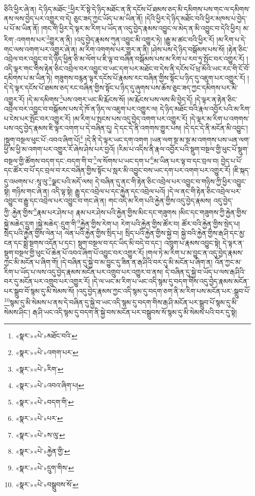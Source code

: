 ཅིའི་ཕྱིར་ཞེ་ན། དེ་ཉིད་མཐོང་\footnote{«སྣར་»«པེ་»མཐོང་བའི་}ཕྱིར་རོ་སྟེ་དེ་ཉིད་མཐོང་ན་ནི་དངོས་པོ་ཐམས་ཅད་མི་དམིགས་པས་གང་ལ་དམིགས་ནས་ལས་བྱེད་པར་འགྱུར་བ་དེ། ཅུང་ཟད་ཀྱང་ཡོད་པ་མ་ཡིན་ནོ། །དེའི་ཕྱིར་དེ་ཉིད་མཐོང་བའི་ཕྱིར་མཁས་པ་བྱེད་པ་པོ་མ་ཡིན་ནོ། །གང་གི་ཕྱིར་དེ་ལྟར་མ་རིག་པ་ཡོད་ན་འདུ་བྱེད་རྣམས་འབྱུང་ལ་མེད་ན་མི་འབྱུང་བ་དེའི་ཕྱིར། མ་རིག་:འགགས་པར་\footnote{«སྣར་»«པེ་»འགག་པར་}གྱུར་ན་ནི། །འདུ་བྱེད་རྣམས་ཀུན་འབྱུང་མི་འགྱུར་ཏེ། །རྒྱུ་མ་ཚང་བའི་ཕྱིར་རོ། །མ་རིག་པ་དེ་གང་ལས་འགག་པར་འགྱུར་ཞེ་ན། མ་རིག་འགགས་པར་གྱུར་ན་ནི། །ཤེས་པས་དེ་ཉིད་བསྒོམས་པས་སོ། །རྟེན་ཅིང་འབྲེལ་བར་འབྱུང་བ་དེ་ཉིད་ཕྱིན་ཅི་མ་ལོག་པ་ཇི་ལྟ་བ་བཞིན་བསྒོམས་པས་མ་རིག་པ་རབ་ཏུ་སྤོང་བར་འགྱུར་རོ། །འདི་ལྟར་གང་གིས་རྟེན་ཅིང་འབྲེལ་བར་འབྱུང་བ་ཡང་དག་པར་མཐོང་བ་དེས་ནི་དངོས་པོ་ཕྲ་མོའི་ཡང་རང་གི་ངོ་བོ་དམིགས་པ་མ་ཡིན་ཏེ། གཟུགས་བརྙན་ལྟར་དངོས་པོ་རྣམས་རང་བཞིན་གྱིས་སྟོང་པ་ཉིད་དུ་འཇུག་པར་འགྱུར་རོ། །དེ་དེ་ལྟར་དངོས་པོ་ཐམས་ཅད་རང་བཞིན་གྱིས་སྟོང་པ་ཉིད་དུ་ཞུགས་པས་ཆོས་ཅུང་ཟད་ཀྱང་དམིགས་པར་མི་འགྱུར་རོ། །དེ་མ་དམིགས་\footnote{«སྣར་»«པེ་»རིག་}པས་འགར་ཡང་མི་རྨོངས་སོ། །མ་རྨོངས་པས་ལས་མི་བྱེད་དོ། །དེ་ལྟར་ན་རྟེན་ཅིང་འབྲེལ་བར་འབྱུང་བ་བསྒོམས་པས་དེ་ཁོ་ན་ཉིད་ལ་འཇུག་པར་འགྱུར་ལ། དེ་ཉིད་མཐོང་བའི་རྣལ་འབྱོར་པའི་མ་རིག་པ་ངེས་པར་སྤོང་བར་འགྱུར་རོ། །མ་རིག་པ་སྤངས་པས་འདུ་བྱེད་འགག་པར་འགྱུར་རོ། །དེ་ལྟར་མ་རིག་པ་འགགས་པས་འདུ་བྱེད་རྣམས་ཇི་ལྟར་འགག་པ་དེ་བཞིན་དུ། དེ་དང་དེ་ནི་འགགས་གྱུར་པས། །དེ་དང་དེ་ནི་མངོན་མི་འབྱུང་། །སྡུག་བསྔལ་ཕུང་པོ་:འབའ་ཞིག་པོ།\footnote{«སྣར་»«པེ་»འབའ་ཞིག་པ།} །དེ་ནི་དེ་ལྟར་ཡང་དག་འགག །ཡན་ལག་སྔ་མ་སྔ་མ་འགགས་པས་ཡན་ལག་ཕྱི་མ་ཕྱི་མ་འགག་པར་འགྱུར་རོ་ཞེས་ཤེས་པར་བྱའོ། །རིམ་པ་འདིས་ནི་རྣལ་འབྱོར་པའི་སྡུག་བསྔལ་གྱི་ཕུང་པོ་སྡུག་བསྔལ་གྱི་ཚོགས་བདག་དང་:བདག་གི་བ་\footnote{«སྣར་»«པེ་»བདག་གི་}ལ་སོགས་པ་ཡང་དག་པ་\footnote{«སྣར་»«པེ་»པར་}མ་ཡིན་པར་ལྟ་བ་དང་བྲལ་བ། བྱེད་པ་པོ་དང་ཚོར་བ་པོ་དང་བྲལ་བ་རང་བཞིན་གྱིས་སྟོང་པ་སླར་མི་འབྱུང་བས་ཡང་དག་པར་འགག་པར་འགྱུར་རོ། །ཇི་སྐད་དུ་འཕགས་པ་:སཱ་ལུ་\footnote{«སྣར་»«པེ་»ས་ལུ་}ལྗང་པའི་མདོ་ལས། དེ་བཞིན་དུ་ནང་གི་རྟེན་ཅིང་འབྲེལ་པར་འབྱུང་བ་གཉིས་ཀྱི་ཕྱིར་འབྱུང་སྟེ། གཉིས་གང་ཞེ་ན། འདི་ལྟ་སྟེ། རྒྱུ་དང་འབྲེལ་པ་དང་རྐྱེན་དང་འབྲེལ་པའོ། །དེ་ལ་ནང་གི་རྟེན་ཅིང་འབྲེལ་པར་འབྱུང་བ་རྒྱུ་དང་འབྲེལ་པར་འབྱུང་བ་གང་ཞེ་ན། གང་འདི་མ་རིག་པའི་རྐྱེན་གྱིས་འདུ་བྱེད་རྣམས། འདུ་བྱེད་ཀྱི་:རྐྱེན་གྱིས་\footnote{«སྣར་»«པེ་»རྐྱེན་གྱི་}རྣམ་པར་ཤེས་པ། རྣམ་པར་ཤེས་པའི་རྐྱེན་གྱིས་མིང་དང་གཟུགས །མིང་དང་གཟུགས་ཀྱི་རྐྱེན་གྱིས་སྐྱེ་མཆེད་དྲུག །སྐྱེ་མཆེད་:དྲུག་གི་\footnote{«སྣར་»«པེ་»དྲུག་གིས་}རྐྱེན་གྱིས་རེག་པ། རེག་པའི་རྐྱེན་གྱིས་ཚོར་བ། ཚོར་བའི་རྐྱེན་གྱིས་སྲེད་པ། སྲེད་པའི་རྐྱེན་གྱིས་ལེན་པ། ལེན་པའི་རྐྱེན་གྱིས་སྲིད་པ། སྲིད་པའི་རྐྱེན་གྱིས་སྐྱེ་བ། སྐྱེ་བའི་རྐྱེན་གྱིས་རྒ་ཤི་དང་མྱ་ངན་དང་སྨྲེ་སྔགས་འདོན་པ་དང་། སྡུག་བསྔལ་བ་དང་ཡིད་མི་བདེ་བ་དང་། འཁྲུག་པ་རྣམས་འབྱུང་སྟེ། དེ་ལྟར་ན་སྡུག་བསྔལ་གྱི་ཕུང་པོ་ཆེན་པོ་འབའ་ཞིག་པོ་འབྱུང་བར་འགྱུར་རོ། །གལ་ཏེ་མ་རིག་པ་མ་བྱུང་ན་འདུ་བྱེད་རྣམས་ཀྱང་མི་མངོན་པ་ཞིག་གོ། །དེ་བཞིན་དུ་སྐྱེ་བ་མ་བྱུང་དུ་ཟིན་ན་རྒ་ཤིའི་བར་དུ་མི་མངོན་པ་ཞིག་ན། འོན་ཀྱང་མ་རིག་པ་ཡོད་པ་ལས་འདུ་བྱེད་རྣམས་མངོན་པར་འགྲུབ་པར་འགྱུར་བ་ནས། དེ་བཞིན་དུ་སྐྱེ་བ་ཡོད་པ་ལས་རྒ་ཤིའི་བར་དུ་མངོན་པར་འགྲུབ་པར་འགྱུར་རོ། །དེ་ལ་ཡང་མ་རིག་པ་ཡང་འདི་སྙམ་དུ་བདག་གིས་འདུ་བྱེད་རྣམས་མངོན་པར་སྒྲུབ་བོ་སྙམ་དུ་མི་སེམས་སོ། །འདུ་བྱེད་རྣམས་ཀྱང་འདི་སྙམ་དུ་བདག་ཅག་ནི་མ་རིག་པས་མངོན་པར་:སྒྲུབ་པོ་\footnote{«སྣར་»«པེ་»བསྒྲུབས་སོ་}སྙམ་དུ་མི་སེམས་པ་ནས་དེ་བཞིན་དུ་སྐྱེ་བ་ཡང་འདི་སྙམ་དུ་བདག་གིས་རྒ་ཤི་མངོན་པར་སྒྲུབ་པོ་སྙམ་དུ་མི་སེམས་ཤིང་། རྒ་ཤི་ཡང་འདི་སྙམ་དུ་བདག་ནི་སྐྱེ་བས་མངོན་པར་བསྒྲུབས་སོ་སྙམ་དུ་མི་སེམས་པའི་བར་དུ་སྟེ། 